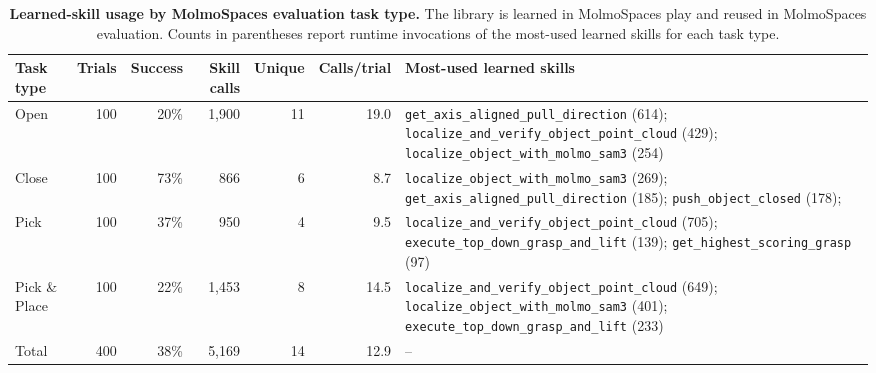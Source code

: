 \begin{table}[t]
\noindent
\caption{
\textbf{Learned-skill usage by MolmoSpaces evaluation task type.}
The library is learned in MolmoSpaces play and reused in MolmoSpaces
evaluation. Counts in parentheses report runtime invocations of the most-used
learned skills for each task type.
}
\label{tab:eval_task_skill_usage}
\vspace{1.5em}
\begin{minipage}{0.9\textwidth}

\small
\setlength{\tabcolsep}{2pt}
\renewcommand{\arraystretch}{1.15}

\begin{tabularx}{\textwidth}{lrrrrr X}
\toprule
\textbf{Task type} & \textbf{Trials} & \textbf{Success} & \textbf{Skill calls} & \textbf{Unique} & \textbf{Calls/trial} & \textbf{Most-used learned skills} \\
\midrule
Open & 100 & 20\% & 1,900 & 11 & 19.0 &
\texttt{get\_axis\_aligned\_pull\_direction} (614);
\texttt{localize\_and\_verify\_object\_point\_cloud} (429);
\texttt{localize\_object\_with\_molmo\_sam3} (254) \\

Close & 100 & 73\% & 866 & 6 & 8.7 &
\texttt{localize\_object\_with\_molmo\_sam3} (269);
\texttt{get\_axis\_aligned\_pull\_direction} (185);\newline
\texttt{push\_object\_closed} (178); \\

Pick & 100 & 37\% & 950 & 4 & 9.5 &
\texttt{localize\_and\_verify\_object\_point\_cloud} (705);
\texttt{execute\_top\_down\_grasp\_and\_lift} (139);
\texttt{get\_highest\_scoring\_grasp} (97) \\

Pick \& Place & 100 & 22\% & 1,453 & 8 & 14.5 &
\texttt{localize\_and\_verify\_object\_point\_cloud} (649);
\texttt{localize\_object\_with\_molmo\_sam3} (401);
\texttt{execute\_top\_down\_grasp\_and\_lift} (233) \\
\midrule
Total & 400 & 38\% & 5,169 & 14 & 12.9 & -- \\
\bottomrule
\end{tabularx}
\end{minipage}
\end{table}



